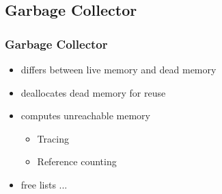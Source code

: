 	\subsection{Garbage Collector} 
	\begin{frame}
		\frametitle{Garbage Collector}
		\begin{itemize}
			\item differs between live memory and dead memory
			\item deallocates dead memory for reuse
			\item computes unreachable memory
			\begin{itemize}
				\item Tracing
				\item Reference counting
			\end{itemize}
			\item free lists ...
		\end{itemize}
	\end{frame}